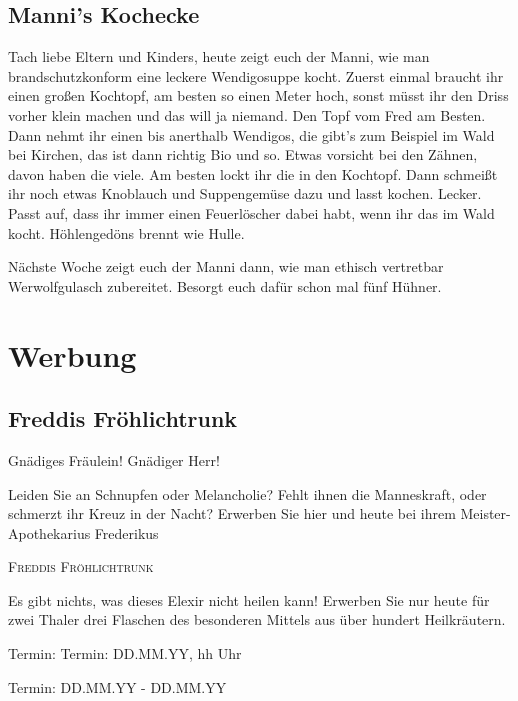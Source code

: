 \documentclass[final]{multiversum}
\begin{document}
\subsection{Manni's Kochecke}
Tach liebe Eltern und Kinders, heute zeigt euch der Manni, wie man
brandschutzkonform eine leckere Wendigosuppe kocht. Zuerst einmal braucht ihr
einen großen Kochtopf, am besten so einen Meter hoch, sonst müsst ihr den Driss
vorher klein machen und das will ja niemand. Den Topf vom Fred am Besten. 
Dann nehmt ihr einen bis anerthalb Wendigos, die gibt's zum Beispiel im Wald bei Kirchen, 
das ist dann richtig Bio und so. Etwas vorsicht bei den Zähnen, davon haben die viele. 
Am besten lockt ihr die in den Kochtopf. Dann schmeißt ihr noch etwas Knoblauch und Suppengemüse
dazu und lasst kochen. Lecker. Passt auf, dass ihr immer einen Feuerlöscher
dabei habt, wenn ihr das im Wald kocht. Höhlengedöns brennt wie Hulle.

Nächste Woche zeigt euch der Manni dann, wie man ethisch vertretbar
Werwolfgulasch zubereitet. Besorgt euch dafür schon mal fünf Hühner.

\section{Werbung}
\subsection{Freddis Fröhlichtrunk}
Gnädiges Fräulein! Gnädiger Herr!  

Leiden Sie an Schnupfen oder Melancholie? Fehlt ihnen die Manneskraft, oder schmerzt ihr Kreuz in der Nacht? Erwerben Sie hier und heute bei ihrem Meister-Apothekarius Frederikus

\begin{center}\textsc{Freddis Fröhlichtrunk}\end{center}

Es gibt nichts, was dieses Elexir nicht heilen kann! Erwerben Sie nur heute für zwei Thaler drei Flaschen des besonderen Mittels aus über hundert Heilkräutern. 


\begin{termine}
\item Termin: Termin: DD.MM.YY, hh Uhr
  \item Termin: DD.MM.YY - DD.MM.YY
\end{termine}
\impressum
\end{document}
